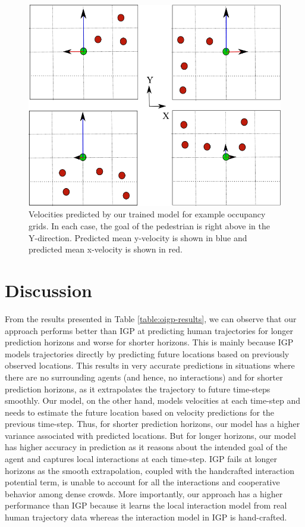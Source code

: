 \begin{figure}[t!]
  \centering
  \includegraphics[width=0.7\linewidth]{Figures/sample-ogrid.png}
  \caption{Velocities predicted by our trained model for example occupancy grids. In each case, the goal of the pedestrian is right above in the Y-direction. Predicted mean y-velocity is shown in blue and predicted mean x-velocity is shown in red.}
  \label{fig:oigp-learnedmodel}
  \vspace{-15pt}
\end{figure}

\section{Discussion}
\label{sec:oigp-discussion}

From the results presented in Table \ref{table:oigp-results}, we can
observe that our approach performs better than IGP at predicting human
trajectories for longer prediction horizons and worse for shorter
horizons. This is mainly because IGP models trajectories directly by
predicting future locations based on previously observed locations. This
results in very accurate predictions in situations where there are no
surrounding agents (and hence, no interactions) and for shorter
prediction horizons, as it extrapolates the trajectory to future
time-steps smoothly. Our model, on the other hand, models velocities
at each time-step and needs to estimate the future location based on
velocity predictions for the previous time-step. Thus, for shorter
prediction horizons, our model has a higher variance associated with
predicted locations. But for longer horizons, our model has higher
accuracy in prediction as it reasons about the intended goal of the
agent and captures local interactions at each time-step. IGP fails at
longer horizons as the smooth extrapolation, coupled with the
handcrafted interaction potential term, is unable to account for all
the interactions and cooperative behavior among dense crowds. More
importantly, our approach has a higher performance than IGP because it
learns the local interaction model from real human trajectory data
whereas the interaction model in IGP is hand-crafted.

